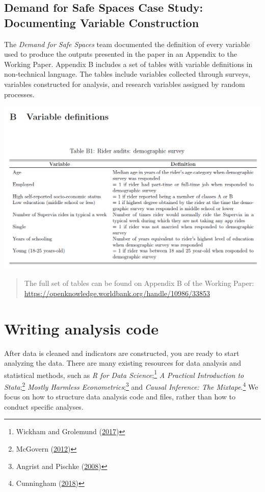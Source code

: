 \documentclass[
]{book}
\begin{document}
\begin{ex}
\hypertarget{demand-for-safe-spaces-case-study-documenting-variable-construction}{%
\subsection{Demand for Safe Spaces Case Study: Documenting Variable Construction}\label{demand-for-safe-spaces-case-study-documenting-variable-construction}}

The \emph{Demand for Safe Spaces} team documented the definition of every variable used to produce the outputs presented in the paper in an Appendix to the Working Paper. Appendix B includes a set of tables with variable definitions in non-technical language. The tables include variables collected through surveys, variables constructed for analysis, and research variables assigned by random processes.

\includegraphics{examples/dictionary.png}

\begin{quote}
The full set of tables can be found on Appendix B of the Working Paper: \url{https://openknowledge.worldbank.org/handle/10986/33853}
\end{quote}
\end{ex}

\hypertarget{writing-analysis-code}{%
\section*{Writing analysis code}\label{writing-analysis-code}}

After data is cleaned and indicators are constructed, you are ready to start analyzing the data.
There are many existing resources for data analysis and statistical methods, such as
\emph{R for Data Science};\footnote{Wickham and Grolemund (\protect\hyperlink{ref-hadley2017R}{2017})}
\emph{A Practical Introduction to Stata};\footnote{McGovern (\protect\hyperlink{ref-RePEc:gdm:wpaper:9412}{2012})}
\emph{Mostly Harmless Econometrics};\footnote{Angrist and Pischke (\protect\hyperlink{ref-angrist2008mostly}{2008})}
and \emph{Causal Inference: The Mixtape}.\footnote{Cunningham (\protect\hyperlink{ref-cunningham2018causal}{2018})}
We focus on how to structure data analysis code and files, rather than how to conduct specific analyses.
\end{document}
